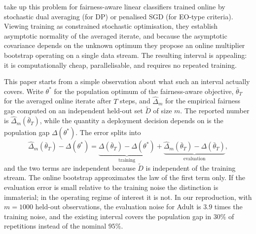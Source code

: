 \documentclass[10pt,twocolumn]{article}
\newcommand{\dhat}{\hat\Delta}
\newcommand{\tbar}{\bar\theta}
\newcommand{\Dt}{\tilde D}
\begin{document}
\citet{roy2026uq} take up this problem for fairness-aware linear classifiers trained online by
stochastic dual averaging (for DP) or penalised SGD (for EO-type criteria).  Viewing training as
constrained stochastic optimisation, they establish asymptotic normality of the averaged iterate, and
because the asymptotic covariance depends on the unknown optimum they propose an online multiplier
bootstrap operating on a single data stream.  The resulting interval is appealing: it is
computationally cheap, parallelisable, and requires no repeated training.

This paper starts from a simple observation about what such an interval actually covers.  Write
$\theta^*$ for the population optimum of the fairness-aware objective, $\tbar_T$ for the averaged
online iterate after $T$ steps, and $\dhat_m$ for the empirical fairness gap computed on an
independent held-out set $\Dt$ of size $m$.  The reported number is $\dhat_m(\tbar_T)$, while the
quantity a deployment decision depends on is the population gap $\Delta(\theta^*)$.  The error
splits into
\[
\dhat_m(\tbar_T)-\Delta(\theta^*)
=\underbrace{\Delta(\tbar_T)-\Delta(\theta^*)}_{\text{training}}
+\underbrace{\dhat_m(\tbar_T)-\Delta(\tbar_T)}_{\text{evaluation}} ,
\]
and the two terms are independent because $\Dt$ is independent of the training stream.
The online bootstrap approximates the law of the first term only.  If the evaluation error is small
relative to the training noise the distinction is immaterial; in the operating regime of interest it
is not.  In our reproduction, with $m=1000$ held-out observations, the evaluation noise for Adult is
$3.9$ times the training noise, and the existing interval covers the population gap in $30\%$ of
repetitions instead of the nominal $95\%$.
\end{document}
